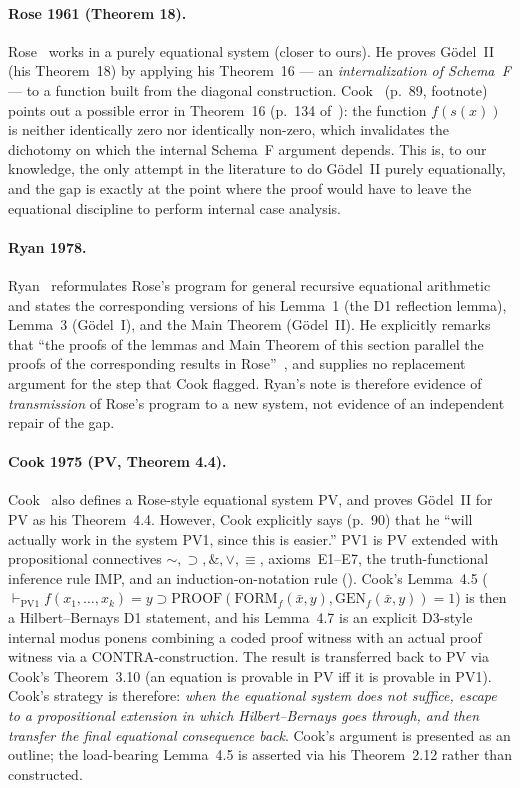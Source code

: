 \documentclass[11pt]{article}
\begin{document}
\paragraph{Rose 1961 (Theorem 18).}
Rose~\cite{rose1961} works in a purely equational system
(closer to ours).  He proves G\"odel~II (his Theorem~18)
by applying his Theorem~16 --- an \emph{internalization of
Schema~F} --- to a function built from the diagonal
construction.  Cook~\cite{cook1975} (p.~89, footnote)
points out a possible error in Theorem~16
(p.~134 of~\cite{rose1961}): the function $f(s(x))$
is neither identically zero nor identically non-zero,
which invalidates the dichotomy on which the internal
Schema~F argument depends.  This is, to our knowledge,
the only attempt in the literature to do G\"odel~II
purely equationally, and the gap is exactly at the
point where the proof would have to leave the equational
discipline to perform internal case analysis.

\paragraph{Ryan 1978.}
Ryan~\cite{ryan1978} reformulates Rose's program for general
recursive equational arithmetic and states the corresponding
versions of his Lemma~1 (the D1 reflection lemma), Lemma~3
(G\"odel~I), and the Main Theorem (G\"odel~II).  He
explicitly remarks that ``the proofs of the lemmas and Main
Theorem of this section parallel the proofs of the
corresponding results in Rose''~\cite{ryan1978}, and supplies
no replacement argument for the step that Cook flagged.
Ryan's note is therefore evidence of \emph{transmission} of
Rose's program to a new system, not evidence of an
independent repair of the gap.

\paragraph{Cook 1975 (PV, Theorem 4.4).}
Cook~\cite{cook1975} also defines a Rose-style equational
system PV, and proves G\"odel~II for PV as his Theorem~4.4.
However, Cook explicitly says (p.~90) that he ``will
actually work in the system PV1, since this is easier.''
PV1 is PV extended with propositional connectives
$\sim, \supset, \&, \vee, \equiv$, axioms~E1--E7, the
truth-functional inference rule IMP, and an
induction-on-notation rule (\cite[Section~3]{cook1975}).
Cook's Lemma~4.5 ($\vdash_{\mathrm{PV1}} f(x_1,\dots,x_k) = y
\supset \mathrm{PROOF}(\mathrm{FORM}_f(\bar x, y),
\mathrm{GEN}_f(\bar x, y)) = 1$) is then a Hilbert--Bernays
D1 statement, and his Lemma~4.7 is an explicit D3-style
internal modus ponens combining a coded proof witness with
an actual proof witness via a CONTRA-construction.  The result
is transferred back to PV via Cook's Theorem~3.10 (an equation
is provable in PV iff it is provable in PV1).  Cook's
strategy is therefore: \emph{when the equational system does
not suffice, escape to a propositional extension in which
Hilbert--Bernays goes through, and then transfer the final
equational consequence back}.  Cook's argument is presented
as an outline; the load-bearing Lemma~4.5 is asserted via
his Theorem~2.12 rather than constructed.
\end{document}
